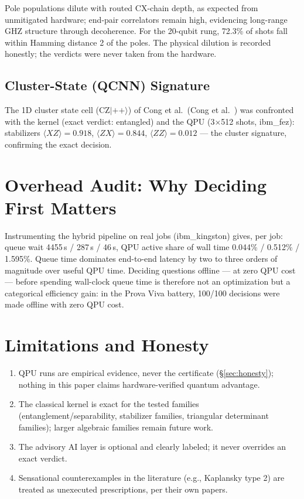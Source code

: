 \documentclass[11pt]{article}
\begin{document}
Pole populations dilute with routed CX-chain depth, as expected from
unmitigated hardware; end-pair correlators remain high, evidencing
long-range GHZ structure through decoherence. For the 20-qubit rung,
72.3\% of shots fall within Hamming distance 2 of the poles. The
physical dilution is recorded honestly; the verdicts were never taken
from the hardware.

\subsection{Cluster-State (QCNN) Signature}
The 1D cluster state cell (CZ$|++\rangle$) of Cong et al.\
(Cong et al.\ \cite{qcnn}) was confronted with the kernel (exact verdict:
entangled) and the QPU (3$\times$512 shots, ibm\_fez): stabilizers
$\langle XZ\rangle = 0.918$, $\langle ZX\rangle = 0.844$,
$\langle ZZ\rangle = 0.012$ --- the cluster signature, confirming the
exact decision.

\section{Overhead Audit: Why Deciding First Matters}
Instrumenting the hybrid pipeline on real jobs (ibm\_kingston) gives, per
job: queue wait 4455\,s / 287\,s / 46\,s, QPU active share of wall time
0.044\% / 0.512\% / 1.595\%. Queue time dominates end-to-end latency by
two to three orders of magnitude over useful QPU time. Deciding
questions offline --- at zero QPU cost --- before spending wall-clock
queue time is therefore not an optimization but a categorical
efficiency gain: in the Prova Viva battery, 100/100 decisions were made
offline with zero QPU cost.

\section{Limitations and Honesty}
\begin{enumerate}
  \item QPU runs are empirical evidence, never the certificate
  (\S\ref{sec:honesty}); nothing in this paper claims hardware-verified
  quantum advantage.
  \item The classical kernel is exact for the tested families
  (entanglement/separability, stabilizer families, triangular
  determinant families); larger algebraic families remain future work.
  \item The advisory AI layer is optional and clearly labeled; it never
  overrides an exact verdict.
  \item Sensational counterexamples in the literature (e.g., Kaplansky
  type 2) are treated as unexecuted prescriptions, per their own papers.
\end{enumerate}
\end{document}
